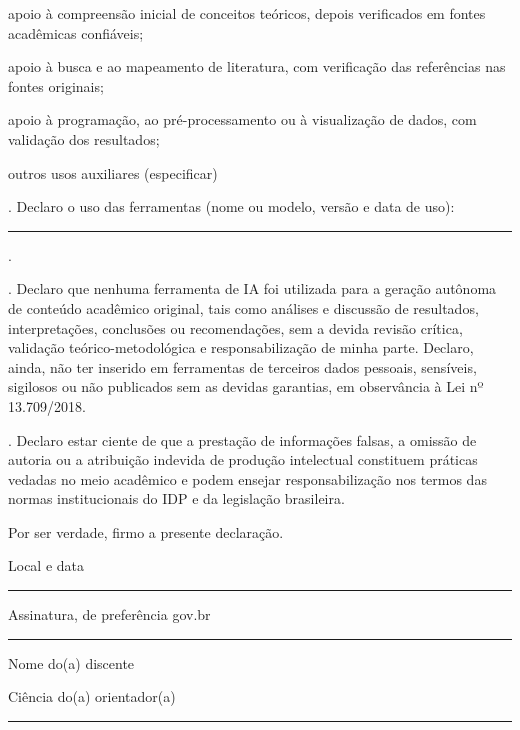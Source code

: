 \documentclass[\NivelTrabalho]{idp}
\begin{document}
\opcaotermo apoio à compreensão inicial de conceitos teóricos, depois verificados
em fontes acadêmicas confiáveis;

\opcaotermo apoio à busca e ao mapeamento de literatura, com verificação das
referências nas fontes originais;

\opcaotermo apoio à programação, ao pré-processamento ou à visualização de dados,
com validação dos resultados;

\opcaotermo outros usos auxiliares (especificar) \hrulefill

. Declaro o uso das ferramentas
\textcolor{termocampo}{(nome ou modelo, versão e data de uso)}:

\hspace*{6mm}\rule{\dimexpr\linewidth-26mm\relax}{0.4pt}.

. Declaro que nenhuma ferramenta de IA foi utilizada para a geração autônoma de
conteúdo acadêmico original, tais como análises e discussão de resultados,
interpretações, conclusões ou recomendações, sem a devida revisão crítica,
validação teórico-metodológica e responsabilização de minha parte. Declaro,
ainda, não ter inserido em ferramentas de terceiros dados pessoais, sensíveis,
sigilosos ou não publicados sem as devidas garantias, em observância à Lei
nº 13.709/2018.

. Declaro estar ciente de que a prestação de informações falsas, a omissão de
autoria ou a atribuição indevida de produção intelectual constituem práticas
vedadas no meio acadêmico e podem ensejar responsabilização nos termos das
normas institucionais do IDP e da legislação brasileira.

\vspace{5mm}
Por ser verdade, firmo a presente declaração.

\vspace{5mm}
Local e data \rule{90mm}{0.4pt}

Assinatura, de preferência gov.br \rule{60mm}{0.4pt}

Nome do(a) discente \NomeAutor

Ciência do(a) orientador(a) \rule{65mm}{0.4pt}
\end{document}
